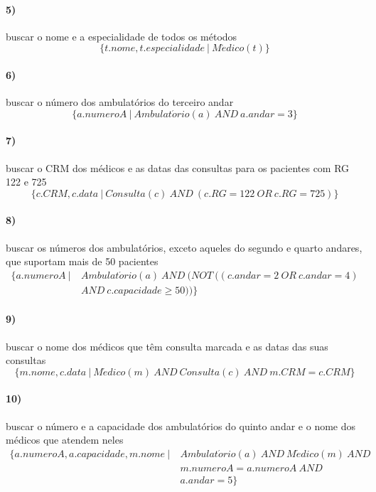 \documentclass[12pt]{article}
\begin{document}
\paragraph{5)} buscar o nome e a especialidade de todos os métodos
\[
    \{ t.nome, t.especialidade \ |\ M\acute{e}dico(t) \}
\]

\paragraph{6)} buscar o número dos ambulatórios do terceiro andar
\[
    \{ a.numeroA\ |\ Ambulat\acute{o}rio(a)\ AND\ a.andar = 3  \}
\]

\paragraph{7)} buscar o CRM dos médicos e as datas das consultas para os pacientes com RG 122 e 725
\[
    \{ c.CRM, c.data\ |\ Consulta(c)\ AND\ (c.RG = 122\ OR\ c.RG = 725) \}
\]

\paragraph{8)} buscar os números dos ambulatórios, exceto aqueles do segundo e quarto andares, que suportam mais de 50 pacientes
\begin{align*}
    \{ a.numeroA\ |\ & Ambulat\acute{o}rio(a)\ AND\ (NOT\ ((c.andar = 2\ OR\ c.andar = 4) \\
    & AND\ c.capacidade \geq 50)) \}
\end{align*}

\paragraph{9)} buscar o nome dos médicos que têm consulta marcada e as datas das suas consultas
\[
    \{ m.nome, c.data\ |\ M\acute{e}dico(m)\ AND\ Consulta(c)\ AND\ m.CRM = c.CRM \}
\]

\paragraph{10)} buscar o número e a capacidade dos ambulatórios do quinto andar e o nome dos médicos que atendem neles
\begin{align*}
    \{ a.numeroA, a.capacidade, m.nome\ |\ & Ambulat\acute{o}rio(a)\ AND\ M\acute{e}dico(m)\ AND\\
    & m.numeroA = a.numeroA\ AND\\
    & a.andar = 5 \}
\end{align*}
\end{document}
